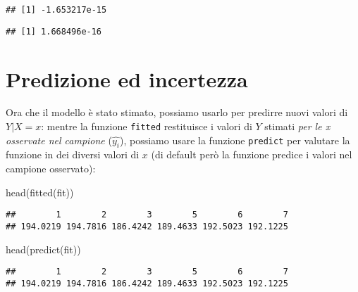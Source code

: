 \documentclass[
]{article}
\newenvironment{Shaded}{\begin{snugshade}}{\end{snugshade}}
\newcommand{\CommentTok}[1]{\textcolor[rgb]{0.56,0.35,0.01}{\textit{#1}}}
\newcommand{\FunctionTok}[1]{\textcolor[rgb]{0.00,0.00,0.00}{#1}}
\newcommand{\NormalTok}[1]{#1}
\newcommand{\SpecialCharTok}[1]{\textcolor[rgb]{0.00,0.00,0.00}{#1}}
\begin{document}
\begin{verbatim}
## [1] -1.653217e-15
\end{verbatim}

\begin{Shaded}
\end{Shaded}

\begin{verbatim}
## [1] 1.668496e-16
\end{verbatim}

\hypertarget{predizione-ed-incertezza}{%
\section{Predizione ed incertezza}\label{predizione-ed-incertezza}}

Ora che il modello è stato stimato, possiamo usarlo per predirre nuovi
valori di \(Y|X=x\): mentre la funzione \texttt{fitted} restituisce i
valori di \(Y\) stimati \emph{per le x osservate nel campione}
(\(\hat{y_i}\)), possiamo usare la funzione \texttt{predict} per
valutare la funzione in dei diversi valori di \(x\) (di default però la
funzione predice i valori nel campione osservato):

\begin{Shaded}
\begin{Highlighting}[]
\FunctionTok{head}\NormalTok{(}\FunctionTok{fitted}\NormalTok{(fit))}
\end{Highlighting}
\end{Shaded}

\begin{verbatim}
##        1        2        3        5        6        7 
## 194.0219 194.7816 186.4242 189.4633 192.5023 192.1225
\end{verbatim}

\begin{Shaded}
\begin{Highlighting}[]
\FunctionTok{head}\NormalTok{(}\FunctionTok{predict}\NormalTok{(fit))}
\end{Highlighting}
\end{Shaded}

\begin{verbatim}
##        1        2        3        5        6        7 
## 194.0219 194.7816 186.4242 189.4633 192.5023 192.1225
\end{verbatim}
\end{document}
